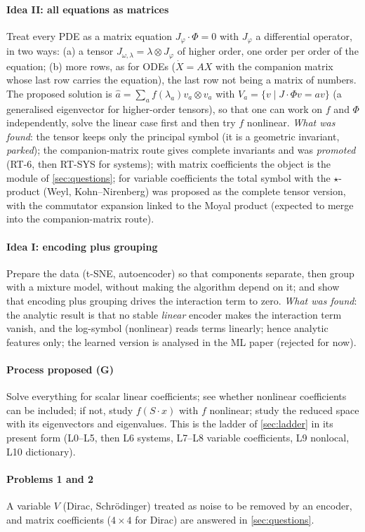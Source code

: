 \paragraph{Idea II: all equations as matrices} Treat every PDE as a matrix equation $J_\varphi\cdot\Phi=0$ with $J_\varphi$ a differential operator, in two ways: (a) a tensor $J_{\omega,\lambda}=\lambda\otimes J_\varphi$ of higher order, one order per order of the equation; (b) more rows, as for ODEs ($\dot X=AX$ with the companion matrix whose last row carries the equation), the last row not being a matrix of numbers.
The proposed solution is $\hat a=\sum_a f(\lambda_a)v_a\otimes v_a$ with $V_a=\{v\mid J\cdot\Phi v=av\}$ (a generalised eigenvector for higher-order tensors), so that one can work on $f$ and $\Phi$ independently, solve the linear case first and then try $f$ nonlinear. \emph{What was found}: the tensor keeps only the principal symbol (it is a geometric invariant, \emph{parked}); the companion-matrix route gives complete invariants and was \emph{promoted} (RT-6, then RT-SYS for systems); with matrix coefficients the object is the module of \cref{sec:questions}; for variable coefficients the total symbol with the $\star$-product (Weyl, Kohn--Nirenberg) was proposed as the complete tensor version, with the commutator expansion linked to the Moyal product (expected to merge into the companion-matrix route).
\paragraph{Idea I: encoding plus grouping} Prepare the data (t-SNE, autoencoder) so that components separate, then group with a mixture model, without making the algorithm depend on it; and show that encoding plus grouping drives the interaction term to zero. \emph{What was found}: the analytic result is that no stable \emph{linear} encoder makes the interaction term vanish, and the log-symbol (nonlinear) reads terms linearly; hence analytic features only; the learned version is analysed in the ML paper (rejected for now).
\paragraph{Process proposed (G)} Solve everything for scalar linear coefficients; see whether nonlinear coefficients can be included; if not, study $f(S\cdot x)$ with $f$ nonlinear; study the reduced space with its eigenvectors and eigenvalues. This is the ladder of \cref{sec:ladder} in its present form (L0--L5, then L6 systems, L7--L8 variable coefficients, L9 nonlocal, L10 dictionary).
\paragraph{Problems 1 and 2} A variable $V$ (Dirac, Schr\"odinger) treated as noise to be removed by an encoder, and matrix coefficients ($4\times4$ for Dirac) are answered in \cref{sec:questions}.
